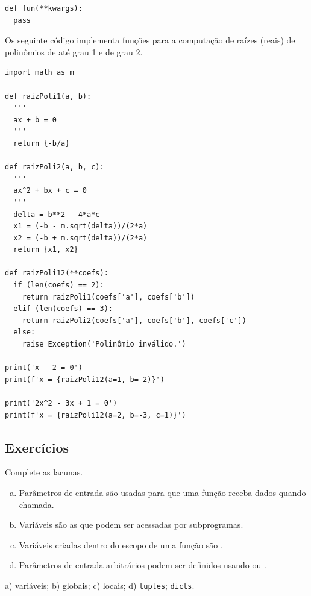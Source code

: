 \begin{lstlisting}
def fun(**kwargs):
  pass
\end{lstlisting}


\begin{ex}
  Os seguinte código implementa funções para a computação de raízes (reais) de polinômios de até grau 1 e de grau 2.

\begin{lstlisting}
import math as m

def raizPoli1(a, b):
  '''
  ax + b = 0
  '''
  return {-b/a}

def raizPoli2(a, b, c):
  '''
  ax^2 + bx + c = 0
  '''
  delta = b**2 - 4*a*c
  x1 = (-b - m.sqrt(delta))/(2*a)
  x2 = (-b + m.sqrt(delta))/(2*a)
  return {x1, x2}

def raizPoli12(**coefs):
  if (len(coefs) == 2):
    return raizPoli1(coefs['a'], coefs['b'])
  elif (len(coefs) == 3):
    return raizPoli2(coefs['a'], coefs['b'], coefs['c'])
  else:
    raise Exception('Polinômio inválido.')

print('x - 2 = 0')
print(f'x = {raizPoli12(a=1, b=-2)}')

print('2x^2 - 3x + 1 = 0')
print(f'x = {raizPoli12(a=2, b=-3, c=1)}')
\end{lstlisting}

\end{ex}

\subsection{Exercícios}


\begin{exer}
  Complete as lacunas.
  \begin{enumerate}[a)]
    \item Parâmetros de entrada são \underline{\phantom{variáveis}} usadas para que uma função receba dados quando chamada.
    \item Variáveis \underline{\phantom{globais}} são as que podem ser acessadas por subprogramas.
    \item Variáveis criadas dentro do escopo de uma função são \underline{\phantom{locais}}.
    \item Parâmetros de entrada arbitrários podem ser definidos usando \underline{} ou \underline{}.
  \end{enumerate}
\end{exer}
\begin{resp}
  a) variáveis; b) globais; c) locais; d) \texttt{tuples}; \texttt{dicts}.
\end{resp}

